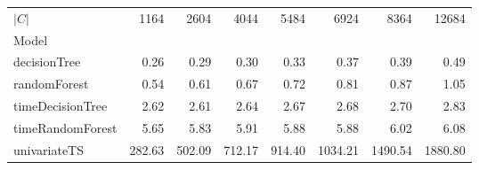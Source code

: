 \begin{tabular}{lrrrrrrr}
\toprule
$|C|$ & 1164 & 2604 & 4044 & 5484 & 6924 & 8364 & 12684 \\
Model &  &  &  &  &  &  &  \\
\midrule
decisionTree & 0.26 & 0.29 & 0.30 & 0.33 & 0.37 & 0.39 & 0.49 \\
randomForest & 0.54 & 0.61 & 0.67 & 0.72 & 0.81 & 0.87 & 1.05 \\
timeDecisionTree & 2.62 & 2.61 & 2.64 & 2.67 & 2.68 & 2.70 & 2.83 \\
timeRandomForest & 5.65 & 5.83 & 5.91 & 5.88 & 5.88 & 6.02 & 6.08 \\
univariateTS & 282.63 & 502.09 & 712.17 & 914.40 & 1034.21 & 1490.54 & 1880.80 \\
\bottomrule
\end{tabular}
